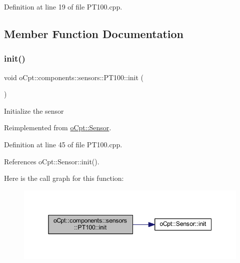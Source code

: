 Definition at line 19 of file P\+T100.\+cpp.



\subsection{Member Function Documentation}
\hypertarget{classo_cpt_1_1components_1_1sensors_1_1_p_t100_a296d0c3c2a55df465e127462c8c30215}{}\label{classo_cpt_1_1components_1_1sensors_1_1_p_t100_a296d0c3c2a55df465e127462c8c30215} 
\subsubsection{\texorpdfstring{init()}{init()}}
{\footnotesize\ttfamily void o\+Cpt\+::components\+::sensors\+::\+P\+T100\+::init (\begin{DoxyParamCaption}{ }\end{DoxyParamCaption})\hspace{0.3cm}{\ttfamily [virtual]}}

Initialize the sensor 

Reimplemented from \hyperlink{classo_cpt_1_1_sensor_aa612a305a9a3091dd62cd1afb9d4dd7d}{o\+Cpt\+::\+Sensor}.



Definition at line 45 of file P\+T100.\+cpp.



References o\+Cpt\+::\+Sensor\+::init().

Here is the call graph for this function\+:\nopagebreak
\begin{figure}[H]
\begin{center}
\leavevmode
\includegraphics[width=345pt]{classo_cpt_1_1components_1_1sensors_1_1_p_t100_a296d0c3c2a55df465e127462c8c30215_cgraph}
\end{center}
\end{figure}
\hypertarget{classo_cpt_1_1components_1_1sensors_1_1_p_t100_a41dfc55a4be7993949feeb5ac013690d}{}\label{classo_cpt_1_1components_1_1sensors_1_1_p_t100_a41dfc55a4be7993949feeb5ac013690d} 
